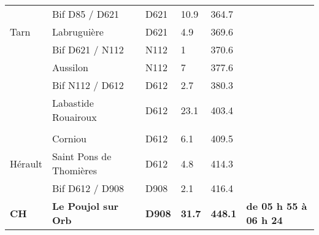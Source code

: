 \documentclass{article}%
\begin{document}
\begin{longtable}{p{2.25cm}|p{7.0cm}|p{1.5cm}|p{1.5cm}|p{1.5cm}|p{3.5cm}}
 &Bif D85 / D621&D621 &10.9&364.7& \\%
Tarn&Labruguière&D621 &4.9&369.6& \\%
 &Bif D621 / N112&N112&1&370.6& \\%
 &Aussilon &N112&7&377.6& \\%
 &Bif N112  / D612&D612 &2.7&380.3& \\%
 &Labastide Rouairoux&D612 &23.1&403.4& \\%
\hline& & & & & \\%
 &Corniou&D612 &6.1&409.5& \\%
Hérault&Saint Pons de Thomières&D612 &4.8&414.3& \\%
 &Bif D612 / D908&D908&2.1&416.4& \\%
\textbf{CH }&\textbf{Le Poujol sur Orb}&\textbf{D908}&\textbf{31.7}&\textbf{448.1}&\textbf{de 05 h 55 à 06 h 24}\\%
\hline%
\end{longtable}%
\end{document}
